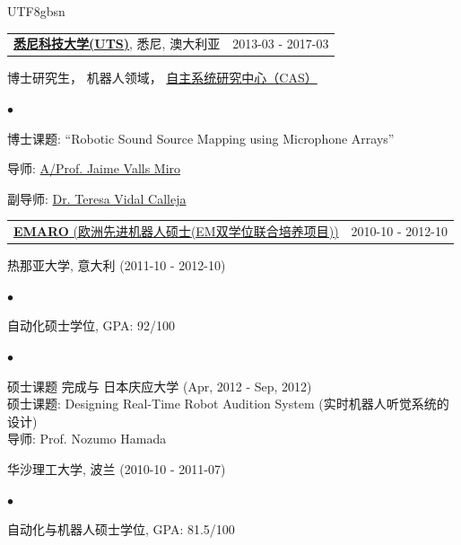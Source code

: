 \documentclass[margin,line]{res}
\newenvironment{list1}{
  \begin{list}{\ding{113}}{%
      \setlength{\itemsep}{0in}
      \setlength{\parsep}{0in} \setlength{\parskip}{0in}
      \setlength{\topsep}{0in} \setlength{\partopsep}{0in} 
      \setlength{\leftmargin}{0.17in}}}{\end{list}}
\newenvironment{list2}{
  \begin{list}{$\bullet$}{%
      \setlength{\itemsep}{0in}
      \setlength{\parsep}{0in} \setlength{\parskip}{0in}
      \setlength{\topsep}{0in} \setlength{\partopsep}{0in} 
      \setlength{\leftmargin}{0.2in}}}{\end{list}}
\begin{document}
\begin{CJK*}{UTF8}{gbsn}
\begin{resume}
\begin{tabularx}{\textwidth}{X r}
\href{http://www.uts.edu.au}{{\bf 悉尼科技大学(UTS)}}, 悉尼, 澳大利亚  &2013-03 - 2017-03\\
\end{tabularx}
\vspace*{-.1in}
\begin{list1}
\item[] 博士研究生， 机器人领域， \href{http://www.cas.uts.edu.au}{自主系统研究中心（CAS）}%
\begin{list2}
\vspace*{.05in}
\item 博士课题:  ``Robotic Sound Source Mapping using Microphone Arrays'' 
\item 导师: \href{http://www.uts.edu.au/staff/jaime.vallsmiro}{A/Prof. Jaime Valls Miro}
\item 副导师:  \href{http://www.uts.edu.au/staff/teresa.vidalcalleja}{Dr. Teresa Vidal Calleja}
\end{list2}
\end{list1}

\begin{tabularx}{\textwidth}{X r}
\href{http://emaro.irccyn.ec-nantes.fr/}{{\bf EMARO} (欧洲先进机器人硕士(EM双学位联合培养项目))} &2010-10 - 2012-10\\
\end{tabularx}
\vspace*{-.1in}
\begin{list1}
\item[] 热那亚大学, 意大利 (2011-10 - 2012-10)
\begin{list2}
\vspace*{.05in}
\item 自动化硕士学位, GPA: 92/100
\end{list2}
\begin{list2}
\vspace*{.05in}
\item 硕士课题 完成与 日本庆应大学 (Apr, 2012 - Sep, 2012)\\
硕士课题: Designing Real-Time Robot Audition System (实时机器人听觉系统的设计)\\
导师: Prof. Nozumo Hamada
\end{list2}
\end{list1}
\begin{list1}
\item[] 华沙理工大学, 波兰 (2010-10 - 2011-07)
\begin{list2}
\vspace*{.05in}
\item 自动化与机器人硕士学位, GPA: 81.5/100
\end{list2}
\end{list1}


\end{resume}
\end{CJK*}
\end{document}
